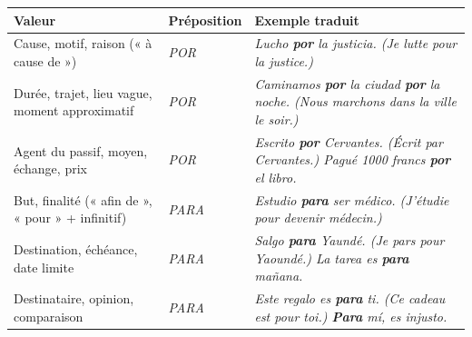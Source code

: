 \documentclass[11pt]{article}
\newcommand{\esp}[1]{\ifmmode\text{\textit{#1}}\else\begingroup\selectlanguage{spanish}\itshape #1\endgroup\fi}
\begin{document}
\begin{propriete}
\begin{center}
\begin{tabularx}{\linewidth}{|X|X|X|}
\hline
\rowcolor{popblueL} \textbf{Valeur} & \textbf{Préposition} & \textbf{Exemple traduit} \\
\hline
Cause, motif, raison (« à cause de ») & \esp{POR} & \esp{Lucho \textbf{por} la justicia.} (Je lutte pour la justice.) \\
\hline
Durée, trajet, lieu vague, moment approximatif & \esp{POR} & \esp{Caminamos \textbf{por} la ciudad \textbf{por} la noche.} (Nous marchons dans la ville le soir.) \\
\hline
Agent du passif, moyen, échange, prix & \esp{POR} & \esp{Escrito \textbf{por} Cervantes.} (Écrit par Cervantes.) \esp{Pagué 1000 francs \textbf{por} el libro.} \\
\hline
But, finalité (« afin de », « pour » + infinitif) & \esp{PARA} & \esp{Estudio \textbf{para} ser médico.} (J'étudie pour devenir médecin.) \\
\hline
Destination, échéance, date limite & \esp{PARA} & \esp{Salgo \textbf{para} Yaundé.} (Je pars pour Yaoundé.) \esp{La tarea es \textbf{para} mañana.} \\
\hline
Destinataire, opinion, comparaison & \esp{PARA} & \esp{Este regalo es \textbf{para} ti.} (Ce cadeau est pour toi.) \esp{\textbf{Para} mí, es injusto.} \\
\hline
\end{tabularx}
\end{center}
\end{propriete}
\end{document}
